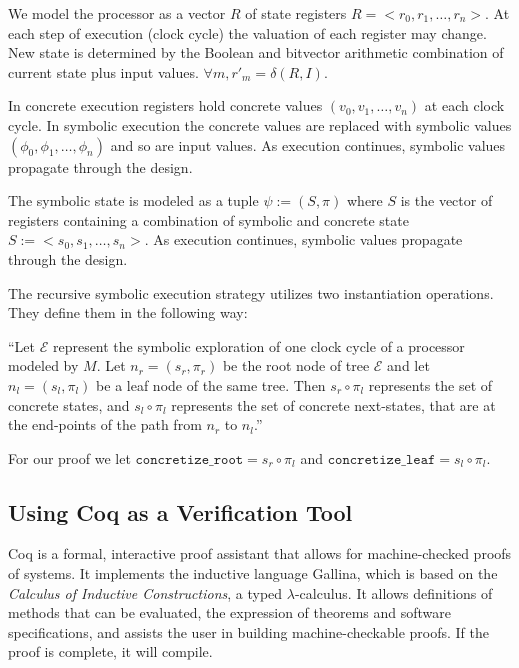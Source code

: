 We model the processor as a vector $R$ of state registers $R = <r_0, r_1,
\ldots, r_n>$. At each step of execution (clock cycle) the valuation of each
register may change. New state is determined by the Boolean and bitvector
arithmetic combination of current state plus input values. $\forall m, r'_m =
\delta(R,I)$.

In concrete execution registers hold concrete values $(v_0, v_1, \ldots, v_n)$
at each clock cycle. In symbolic execution the concrete values are replaced with
symbolic values $(\phi_0, \phi_1, \ldots, \phi_n)$ and so are input values.
As execution continues, symbolic values propagate through the design.

The symbolic state is modeled as a tuple $\psi := (S,\pi)$ where $S$ is the
vector of registers containing a combination of symbolic and concrete state $S
:= <s_0, s_1, \ldots, s_n>$. As execution continues, symbolic values propagate
through the design.

The recursive symbolic execution strategy utilizes two instantiation operations. 
They define them in the following way: 

``Let $\mathcal{E}$ represent the symbolic exploration of one clock cycle of a processor modeled by $M$. Let $n_r = (s_r,\pi_r)$ be the root node of tree $\mathcal{E}$ and let $n_l = (s_l,\pi_l)$ be a leaf node of the same tree. 
Then $s_r \circ \pi_l$ represents the set of concrete states, and $s_l \circ \pi_l$ represents the set of concrete next-states, that are at the end-points of the path from $n_r$ to $n_l$.'' \cite{zhang2018recursive}

For our proof we let $\mathtt{concretize\_root}=  s_r \circ \pi_l$ and $\mathtt{concretize\_leaf} =  s_l \circ \pi_l$.





\subsection{Using Coq as a Verification Tool}

Coq is a formal, interactive proof assistant that allows for machine-checked proofs of systems. 
It implements the inductive language Gallina, which is based on the \textit{Calculus of Inductive Constructions}, a typed $\lambda$-calculus. It allows definitions of methods that can be evaluated, the expression of theorems and software specifications, and assists the user in building machine-checkable proofs. If the proof is complete, it will compile.


